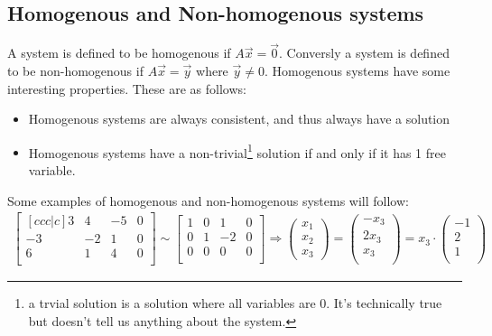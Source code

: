 \documentclass[11pt, a4paper]{article}
\begin{document}
\subsection{Homogenous and Non-homogenous systems}
A system is defined to be homogenous if $A\vec{x} = \vec{0}$.
Conversly a system is defined to be non-homogenous if $A\vec{x} = \vec{y}$ where $\vec{y} \neq 0$.
Homogenous systems have some interesting properties. These are as follows:
\begin{itemize}
  \item Homogenous systems are always consistent, and thus always have a solution
  \item Homogenous systems have a non-trivial\footnote{a trvial solution is a solution where all variables are 0. It's technically true but doesn't tell us anything about the system.} 
        solution if and only if it has 1 free variable.
\end{itemize}

Some examples of homogenous and non-homogenous systems will follow:
\begin{align*}
  \begin{bmatrix}[ccc|c]
    3 & 4 & -5 & 0\\
    -3 & -2 & 1 & 0\\
    6 & 1 & 4 & 0\\
  \end{bmatrix}
  \sim
  \begin{bmatrix}
    1 & 0 & 1 & 0\\
    0 & 1 & -2 & 0\\
    0 & 0 & 0 & 0\\
  \end{bmatrix}
  \Rightarrow
  \begin{pmatrix} x_1 \\ x_2 \\ x_3 \end{pmatrix}
  = \begin{pmatrix} -x_3\\ 2x_3\\ x_3\\ \end{pmatrix}
  = x_3 \cdot \begin{pmatrix} -1\\ 2\\ 1\\ \end{pmatrix}
\end{align*}
\end{document}
